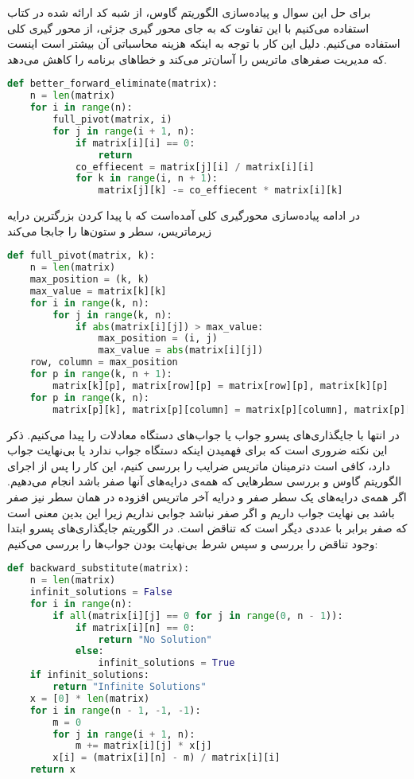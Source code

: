 \documentclass[]{article}
\begin{document}
برای حل این سوال و پیاده‌سازی الگوریتم گاوس، از شبه کد ارائه شده در کتاب استفاده می‌کنیم
با این تفاوت که به جای محور گیری جزئی، از محور گیری کلی استفاده می‌کنیم.
دلیل این کار با توجه به اینکه هزینه محاسباتی آن بیشتر است اینست که مدیریت صفر‌های ماتریس را
آسان‌تر می‌کند و خطا‌های برنامه را کاهش می‌دهد.
\begin{latin}
\begin{lstlisting}[language=python]
def better_forward_eliminate(matrix):
    n = len(matrix)
    for i in range(n):
        full_pivot(matrix, i)
        for j in range(i + 1, n):
            if matrix[i][i] == 0:
                return
            co_effiecent = matrix[j][i] / matrix[i][i]
            for k in range(i, n + 1):
                matrix[j][k] -= co_effiecent * matrix[i][k]
\end{lstlisting}
\end{latin}
در ادامه پیاده‌سازی محورگیری کلی آمده‌است که با پیدا کردن بزرگترین درایه زیرماتریس، سطر و ستون‌ها را جابجا می‌کند
\begin{latin}
\begin{lstlisting}[language=python]
def full_pivot(matrix, k):
    n = len(matrix)
    max_position = (k, k)
    max_value = matrix[k][k]
    for i in range(k, n):
        for j in range(k, n):
            if abs(matrix[i][j]) > max_value:
                max_position = (i, j)
                max_value = abs(matrix[i][j])
    row, column = max_position
    for p in range(k, n + 1):
        matrix[k][p], matrix[row][p] = matrix[row][p], matrix[k][p]
    for p in range(k, n):
        matrix[p][k], matrix[p][column] = matrix[p][column], matrix[p][k]
\end{lstlisting}
\end{latin}
در انتها با جایگذاری‌های پسرو جواب یا جواب‌های دستگاه معادلات را پیدا می‌کنیم.
ذکر این نکته ضروری است که برای فهمیدن اینکه دستگاه جواب ندارد یا بی‌نهایت جواب دارد،
کافی است دترمینان ماتریس ضرایب را بررسی کنیم،
این کار را پس از اجرای الگوریتم گاوس و بررسی سطر‌هایی که همه‌ی درایه‌های آنها صفر باشد انجام می‌دهیم.
اگر همه‌ی درایه‌های یک سطر صفر و درایه آخر ماتریس افزوده در همان سطر نیز صفر باشد بی نهایت جواب داریم
و اگر صفر نباشد جوابی نداریم زیرا این بدین معنی است که صفر برابر با عددی دیگر است که تناقض است.
در الگوریتم جایگذاری‌های پسرو ابتدا وجود تناقض را بررسی و سپس شرط بی‌نهایت بودن جواب‌ها را بررسی می‌کنیم:
\pagebreak
\begin{latin}
\begin{lstlisting}[language=python]
def backward_substitute(matrix):
    n = len(matrix)
    infinit_solutions = False
    for i in range(n):
        if all(matrix[i][j] == 0 for j in range(0, n - 1)):
            if matrix[i][n] == 0:
                return "No Solution"
            else:
                infinit_solutions = True
    if infinit_solutions:
        return "Infinite Solutions"
    x = [0] * len(matrix)
    for i in range(n - 1, -1, -1):
        m = 0
        for j in range(i + 1, n):
            m += matrix[i][j] * x[j]
        x[i] = (matrix[i][n] - m) / matrix[i][i]
    return x
\end{lstlisting}
\end{latin}
\end{document}
